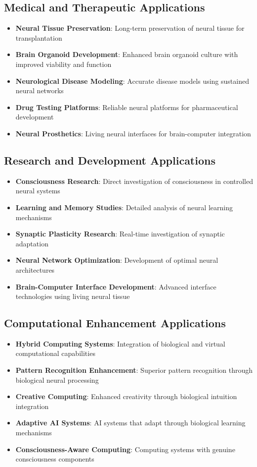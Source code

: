 \documentclass[12pt,a4paper]{article}
\begin{document}
\subsection{Medical and Therapeutic Applications}

\begin{itemize}
\item \textbf{Neural Tissue Preservation}: Long-term preservation of neural tissue for transplantation
\item \textbf{Brain Organoid Development}: Enhanced brain organoid culture with improved viability and function
\item \textbf{Neurological Disease Modeling}: Accurate disease models using sustained neural networks
\item \textbf{Drug Testing Platforms}: Reliable neural platforms for pharmaceutical development
\item \textbf{Neural Prosthetics}: Living neural interfaces for brain-computer integration
\end{itemize}

\subsection{Research and Development Applications}

\begin{itemize}
\item \textbf{Consciousness Research}: Direct investigation of consciousness in controlled neural systems
\item \textbf{Learning and Memory Studies}: Detailed analysis of neural learning mechanisms
\item \textbf{Synaptic Plasticity Research}: Real-time investigation of synaptic adaptation
\item \textbf{Neural Network Optimization}: Development of optimal neural architectures
\item \textbf{Brain-Computer Interface Development}: Advanced interface technologies using living neural tissue
\end{itemize}

\subsection{Computational Enhancement Applications}

\begin{itemize}
\item \textbf{Hybrid Computing Systems}: Integration of biological and virtual computational capabilities
\item \textbf{Pattern Recognition Enhancement}: Superior pattern recognition through biological neural processing
\item \textbf{Creative Computing}: Enhanced creativity through biological intuition integration
\item \textbf{Adaptive AI Systems}: AI systems that adapt through biological learning mechanisms
\item \textbf{Consciousness-Aware Computing}: Computing systems with genuine consciousness components
\end{itemize}
\end{document}
